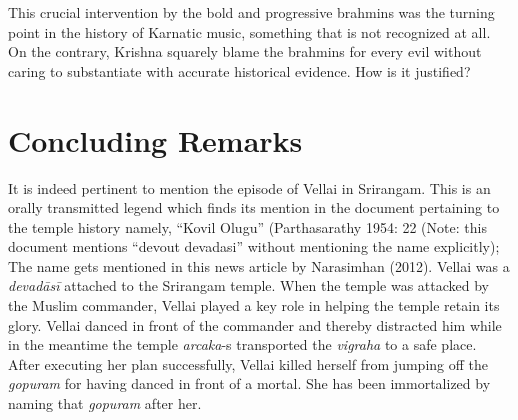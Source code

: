 {This crucial intervention by the bold and progressive brahmins was the turning point in the history of Karnatic music, something that is not recognized at all. On the contrary, Krishna squarely blame the brahmins for every evil without caring to substantiate with accurate historical evidence. How is it justified?


\section*{Concluding Remarks}

It is indeed pertinent to mention the episode of Vellai in Srirangam. This is an orally transmitted legend which finds its mention in the document pertaining to the temple history namely, “Kovil Olugu” (Parthasarathy 1954: 22 (Note: this document mentions “devout devadasi” without mentioning the name explicitly); The name gets mentioned in this news article by Narasimhan (2012). Vellai was a \textit{devadāsī} attached to the Srirangam temple. When the temple was attacked by the Muslim commander, Vellai played a key role in helping the temple retain its glory. Vellai danced in front of the commander and thereby distracted him while in the meantime the temple \textit{arcaka}-s transported the \textit{vigraha} to a safe place. After executing her plan successfully, Vellai killed herself from jumping off the \textit{gopuram} for having danced in front of a mortal. She has been immortalized by naming that \textit{gopuram} after her.

}
